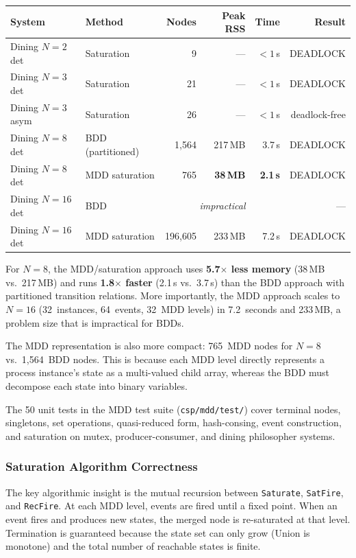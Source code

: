 \documentclass[11pt]{article}
\begin{document}
\begin{center}
\begin{tabular}{llrrrr}
\toprule
\textbf{System} & \textbf{Method} & \textbf{Nodes} & \textbf{Peak RSS} & \textbf{Time} & \textbf{Result} \\
\midrule
Dining $N{=}2$ det & Saturation & 9 & --- & $< 1$\,s & DEADLOCK \\
Dining $N{=}3$ det & Saturation & 21 & --- & $< 1$\,s & DEADLOCK \\
Dining $N{=}3$ asym & Saturation & 26 & --- & $< 1$\,s & deadlock-free \\
\midrule
Dining $N{=}8$ det & BDD (partitioned) & 1,564 & 217\,MB & 3.7\,s & DEADLOCK \\
Dining $N{=}8$ det & MDD saturation & 765 & \textbf{38\,MB} & \textbf{2.1\,s} & DEADLOCK \\
\midrule
Dining $N{=}16$ det & BDD & \multicolumn{3}{c}{\textit{impractical}} & --- \\
Dining $N{=}16$ det & MDD saturation & 196,605 & 233\,MB & 7.2\,s & DEADLOCK \\
\bottomrule
\end{tabular}
\end{center}

For $N = 8$, the MDD/saturation approach uses \textbf{5.7$\times$ less
memory} (38\,MB vs.\ 217\,MB) and runs \textbf{1.8$\times$ faster}
(2.1\,s vs.\ 3.7\,s) than the BDD approach with partitioned transition
relations.  More importantly, the MDD approach scales to $N = 16$
(32~instances, 64~events, 32~MDD levels) in 7.2~seconds and 233\,MB,
a problem size that is impractical for BDDs.

The MDD representation is also more compact: 765~MDD nodes for $N = 8$
vs.\ 1,564~BDD nodes.  This is because each MDD level directly
represents a process instance's state as a multi-valued child array,
whereas the BDD must decompose each state into binary variables.

The 50 unit tests in the MDD test suite (\texttt{csp/mdd/test/})
cover terminal nodes, singletons, set operations, quasi-reduced form,
hash-consing, event construction, and saturation on mutex,
producer-consumer, and dining philosopher systems.

\subsubsection{Saturation Algorithm Correctness}

The key algorithmic insight is the mutual recursion between
\texttt{Saturate}, \texttt{SatFire}, and \texttt{RecFire}.  At each
MDD level, events are fired until a fixed point.  When an event fires
and produces new states, the merged node is re-saturated at that level.
Termination is guaranteed because the state set can only grow (Union
is monotone) and the total number of reachable states is finite.
\end{document}
